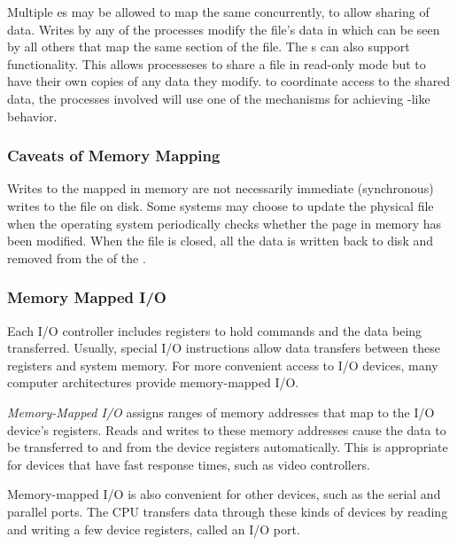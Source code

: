 Multiple es may be allowed to map the same  concurrently, to allow sharing of data.
Writes by any of the processes modify the file's data in  which can be seen by all others that map the same section of the file.
The  s can also support  functionality.
This allows processeses to share a file in read-only mode but to have their own copies of any data they modify.
to coordinate access to the shared data, the processes involved will use one of the mechanisms for achieving -like behavior.

\subsubsection{Caveats of Memory Mapping}\label{subsubsec:Memory_Mapping_Caveats}
Writes to the  mapped in memory are not necessarily immediate (synchronous) writes to the file on disk.
Some systems may choose to update the physical file when the operating system periodically checks whether the page in memory has been modified.
When the file is closed, all the data is written back to disk and removed from the  of the .

\subsubsection{Memory Mapped I/O}\label{subsubsec:Memory_Mapped_IO}
Each I/O controller includes registers to hold commands and the data being transferred.
Usually, special I/O instructions allow data transfers between these registers and system memory.
For more convenient access to I/O devices, many computer architectures provide memory-mapped I/O.

\begin{definition}\label{def:Memory_Mapped_IO}
  \emph{Memory-Mapped I/O} assigns ranges of memory addresses that map to the I/O device's registers.
  Reads and writes to these memory addresses cause the data to be transferred to and from the device registers automatically.
  This is appropriate for devices that have fast response times, such as video controllers.

  Memory-mapped I/O is also convenient for other devices, such as the serial and parallel ports.
  The CPU transfers data through these kinds of devices by reading and writing a few device registers, called an I/O port.
\end{definition}

